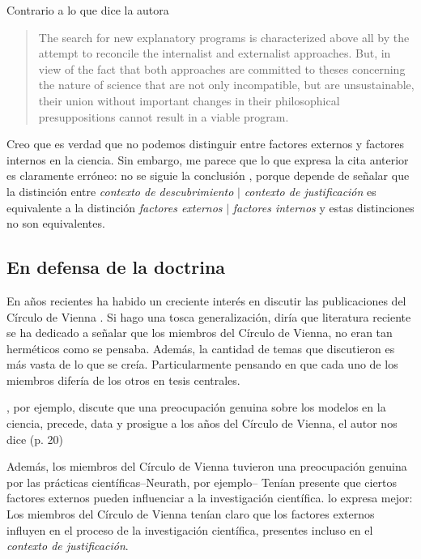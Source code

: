 Contrario a lo que dice la autora

\begin{quote}
	The search for new explanatory programs is characterized above all by the attempt to reconcile the internalist and externalist approaches. But, in view of the fact that both approaches are committed to theses concerning the nature of science that are not only incompatible, but are unsustainable, their union without important changes in their philosophical presuppositions cannot result in a viable program. \parencite[p. 79]{Yturbe1995}
\end{quote}

Creo que es verdad que no podemos distinguir entre factores externos y factores internos en la ciencia.
Sin embargo, me parece que lo que expresa la cita anterior es claramente erróneo: no se siguie la conclusión , porque depende de señalar que la distinción entre  \emph{contexto de descubrimiento} $|$ \emph{contexto de justificación} es equivalente a la distinción \emph{factores externos} $|$ \emph{factores internos} y estas distinciones no son equivalentes.



\subsection{En defensa de la doctrina}

\noindent En años recientes ha habido un creciente interés en discutir las publicaciones del Círculo de Vienna \parencite{Bentley2023, Richardson2023, Suarez2024, Riel2014}.
Si hago una tosca generalización, diría que literatura reciente se ha dedicado a señalar que los miembros del Círculo de Vienna, no eran tan herméticos como se pensaba.
Además, la cantidad de temas que discutieron es más vasta de lo que se creía.
Particularmente pensando en que cada uno de los miembros difería de los otros en tesis centrales.

\textcite{Suarez2024}, por ejemplo, discute que una preocupación genuina sobre los modelos en la ciencia, precede, data y prosigue a los años del Círculo de Vienna, el autor nos dice  (p. 20)

Además, los miembros del Círculo de Vienna tuvieron una preocupación genuina por las prácticas científicas--Neurath, por ejemplo--
Tenían presente que ciertos factores externos pueden influenciar a la investigación científica.
\textcite[p. 24]{Bentley2023} lo expresa mejor: 
Los miembros del Círculo de Vienna tenían claro que los factores externos influyen en el proceso de la investigación científica, presentes incluso en el \emph{contexto de justificación}.


